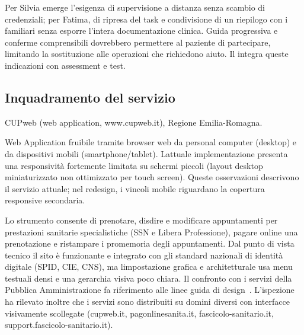 
Per Silvia emerge l'esigenza di supervisione a distanza senza scambio di
credenziali; per Fatima, di ripresa del task e condivisione di un riepilogo
con i familiari senza esporre l'intera documentazione clinica. Guida
progressiva e conferme comprensibili dovrebbero permettere al paziente di
partecipare, limitando la sostituzione alle operazioni che richiedono aiuto.
Il  integra queste indicazioni con assessment e test.

\label{doc:a:05a}

\subsection{Inquadramento del servizio}


CUPweb (web application, www.cupweb.it), Regione
Emilia-Romagna.


Web Application fruibile tramite browser web da personal computer
(desktop) e da dispositivi mobili (smartphone/tablet). L\textquotesingle attuale
implementazione presenta una responsività fortemente limitata su schermi
piccoli (layout desktop miniaturizzato non ottimizzato per touch screen).
Queste osservazioni descrivono il servizio attuale; nel redesign, i vincoli
mobile riguardano la copertura responsive secondaria.


Lo strumento consente di prenotare, disdire e modificare appuntamenti per
prestazioni sanitarie specialistiche (SSN e Libera Professione), pagare
online una prenotazione e ristampare i promemoria degli appuntamenti. Dal punto di vista tecnico
il sito è funzionante e integrato con gli standard nazionali di identità
digitale (SPID, CIE, CNS), ma l\textquotesingle impostazione grafica e
architetturale usa menu testuali densi e una gerarchia visiva poco chiara.
Il confronto con i servizi della Pubblica Amministrazione fa riferimento
alle linee guida di design~\cite{designersItaliaLineeGuida}.
L'ispezione ha rilevato inoltre che i servizi sono distribuiti su domini
diversi con interfacce visivamente scollegate (cupweb.it, pagonlinesanita.it,
fascicolo-sanitario.it, support.fascicolo-sanitario.it).

